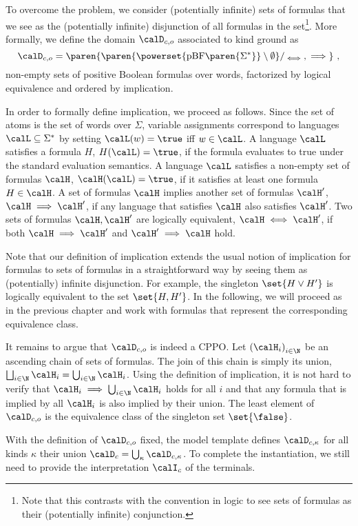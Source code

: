 \documentclass[../../diss.tex]{subfiles}
\begin{document}
To overcome the problem, we consider (potentially infinite) sets of formulas that we see as the (potentially infinite) disjunction of all formulas in the set\footnote{Note that this contrasts with the convention in logic to see sets of formulas as their (potentially infinite) conjunction.}.
More formally, we define the domain $\domainc{\ground}$ associated to kind ground as
\[
    \domainc{\ground} =
    \paren{ \paren{\powerset{\pBF\paren{\Sigma^*}} \setminus \emptyset}/_{\lequiv},\lleq }
    \ ,
\]
non-empty sets of positive Boolean formulas over words, factorized by logical equivalence and ordered by implication.

In order to formally define implication, we proceed as follows.
Since the set of atoms is the set of words over $\Sigma$, variable assignments correspond to languages $\calL \subseteq \Sigma^*$ by setting $\calL(w) = \true$ iff $w \in \calL$.
A language $\calL$ satisfies a formula $H$, $H(\calL) = \true$, if the formula evaluates to true under the standard evaluation semantics.
A language $\calL$ satisfies a non-empty set of formulas $\sof$, $\sof(\calL) = \true$, if it satisfies at least one formula $H \in \sof$.
A set of formulas $\sof$ implies another set of formulas $\sof'$, $\sof \lleq \sof'$, if any language that satisfies $\sof$ also satisfies $\sof'$.
Two sets of formulas $\sof, \sof'$ are logically equivalent, $\sof \lequiv \sof'$, if both $\sof \lleq \sof'$ and $\sof' \lleq \sof$ hold.

Note that our definition of implication extends the usual notion of implication for formulas to sets of formulas in a straightforward way by seeing them as (potentially) infinite disjunction.
For example, the singleton $\set{H \vee H'}$ is logically equivalent to the set $\set{H, H'}$.
In the following, we will proceed as in the previous chapter and work with formulas that represent the corresponding equivalence class.

It remains to argue that $\domainc{\ground}$ is indeed a CPPO.\@
Let ${(\sof_i)}_{i \in \N}$ be an ascending chain of sets of formulas.
The join of this chain is simply its union, $\bigsqcup_{i \in \N} \sof_i = \bigcup_{i \in \N} \sof_i$.
Using the definition of implication, it is not hard to verify that $\sof_i \lleq \bigcup_{i \in \N} \sof_i$ holds for all $i$ and that any formula that is implied by all $\sof_i$ is also implied by their union.
The least element of $\domainc{\ground}$ is the equivalence class of the singleton set $\set{\false}$.

With the definition of $\domainc{\ground}$ fixed, the model template defines $\domainc{\kappa}$ for all kinds $\kappa$ their union $\domainc = \bigcup_{\kappa} \domainc{\kappa}$.
To complete the instantiation, we still need to provide the interpretation $\interpretationc$ of the terminals.
\end{document}

